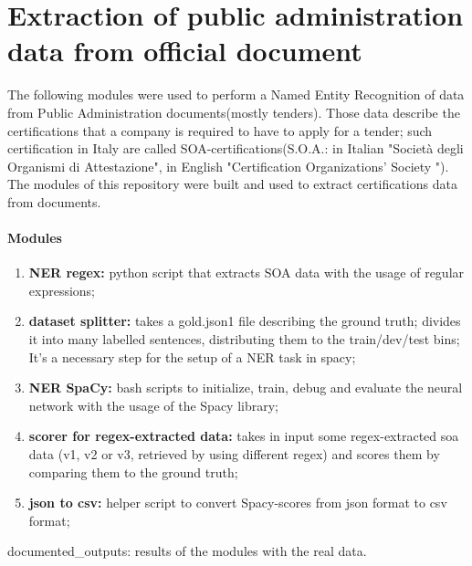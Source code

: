 \documentclass[12pt,leqno]{amsart}
\begin{document}
\section{\textbf{Extraction of public administration data from official document}}
The following modules were used to perform a Named Entity Recognition of data from Public Administration documents(mostly tenders).
Those data describe the certifications that a company is required to have to apply for a tender; such certification in Italy are called SOA-certifications(S.O.A.: in Italian "Società degli Organismi di Attestazione", in English "Certification Organizations' Society ").
The modules of this repository were built and used to extract  certifications data from documents.
\newline
\paragraph{\textbf{Modules}}
\begin{enumerate}
\item{\textbf{NER regex:}}
python script that extracts SOA data with the usage of regular expressions;
\item{\textbf{dataset splitter:}} takes a gold.json1 file describing the ground truth; divides it into many labelled sentences, distributing them to the train/dev/test bins;
It's a necessary step for the setup of a NER task in spacy;
\item{\textbf{NER SpaCy:}} bash scripts to initialize, train, debug and evaluate the neural network with the usage of the Spacy library;
\item{\textbf{scorer for regex-extracted data:}} takes in input some regex-extracted soa data (v1, v2 or v3, retrieved by using different regex) and scores them by comparing them to the ground truth;
\item{\textbf{json to csv:}} helper script to convert Spacy-scores from json format to csv format;
\end{enumerate}
documented\_outputs: results of the modules with the real data.
\newpage
\end{document}
